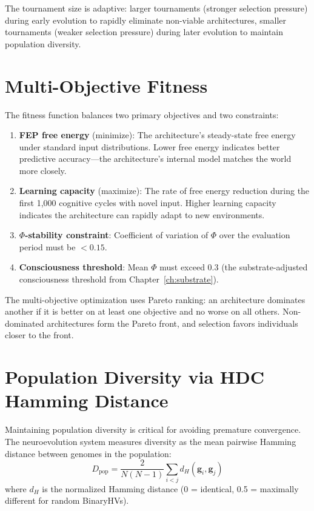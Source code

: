 \documentclass[12pt]{book}
\begin{document}
The tournament size is adaptive: larger tournaments (stronger selection pressure) during early evolution to rapidly eliminate non-viable architectures, smaller tournaments (weaker selection pressure) during later evolution to maintain population diversity.

\section{Multi-Objective Fitness}

The fitness function balances two primary objectives and two constraints:

\begin{enumerate}[label=\arabic*.]
  \item \textbf{FEP free energy} (minimize): The architecture's steady-state free energy under standard input distributions. Lower free energy indicates better predictive accuracy---the architecture's internal model matches the world more closely.
  \item \textbf{Learning capacity} (maximize): The rate of free energy reduction during the first 1,000 cognitive cycles with novel input. Higher learning capacity indicates the architecture can rapidly adapt to new environments.
  \item \textbf{$\Phi$-stability constraint}: Coefficient of variation of $\Phi$ over the evaluation period must be $< 0.15$.
  \item \textbf{Consciousness threshold}: Mean $\Phi$ must exceed 0.3 (the substrate-adjusted consciousness threshold from Chapter~\ref{ch:substrate}).
\end{enumerate}

The multi-objective optimization uses Pareto ranking: an architecture dominates another if it is better on at least one objective and no worse on all others. Non-dominated architectures form the Pareto front, and selection favors individuals closer to the front.

\section{Population Diversity via HDC Hamming Distance}

Maintaining population diversity is critical for avoiding premature convergence. The neuroevolution system measures diversity as the mean pairwise Hamming distance between genomes in the population:
\begin{equation}
D_{\text{pop}} = \frac{2}{N(N-1)} \sum_{i<j} d_H(\mathbf{g}_i, \mathbf{g}_j)
\end{equation}
where $d_H$ is the normalized Hamming distance (0 = identical, 0.5 = maximally different for random BinaryHVs).
\end{document}
